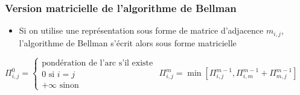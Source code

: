 




\begin{frame}[fragile]
    \frametitle{Version matricielle de l'algorithme de Bellman}
    \begin{itemize}
        \item Si on utilise une représentation sous forme de matrice d'adjacence $m_{i,j}$, l'algorithme de Bellman s'écrit alors sous forme matricielle 
    \end{itemize}
    \begin{algorithmic}[1]
        \State $\Pi_{i,j}^0 = \left\{ 
            \begin{array}{l}
                \mbox{pondération de l'arc s'il existe} \\
                0\mbox{ si } i=j \\
                +\infty \mbox{ sinon}
            \end{array}
        \right.$
                    \State $\Pi_{i,j}^m = \min \left[\Pi_{i,j}^{m-1}, \Pi_{i,m}^{m-1} + \Pi_{m,j}^{m-1} \right] $
                \EndFor
            \EndFor
        \EndFor
        \EndFunction
    \end{algorithmic}
\end{frame}


